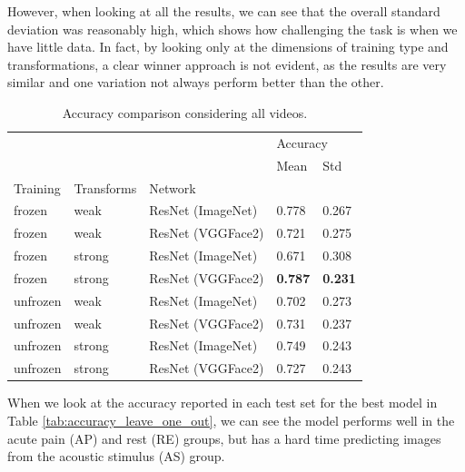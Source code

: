 However, when looking at all the results, we can see that the overall standard deviation was reasonably high, which shows how challenging the task is when we have little data. In fact, by looking only at the dimensions of training type and transformations, a clear winner approach is not evident, as the results are very similar and one variation not always perform better than the other.

\begin{table}[h!tp]
\centering
\caption{Accuracy comparison considering all videos.}
\label{tab:accuracy_all}
\begin{tabular}{lllll}
\toprule
         &        &          & \multicolumn{2}{l}{Accuracy} \\
         &        &          &     Mean &    Std \\
Training & Transforms & Network &          &        \\
\midrule
frozen   & weak   & ResNet (ImageNet) &    0.778 &  0.267 \\
frozen   & weak   & ResNet (VGGFace2) &    0.721 &  0.275 \\
frozen   & strong & ResNet (ImageNet) &    0.671 &  0.308 \\
frozen   & strong & ResNet (VGGFace2) &    \textbf{0.787} & \textbf{ 0.231} \\
unfrozen & weak   & ResNet (ImageNet) &    0.702 &  0.273 \\
unfrozen & weak   & ResNet (VGGFace2) &    0.731 &  0.237 \\
unfrozen & strong & ResNet (ImageNet) &    0.749 &  0.243 \\
unfrozen & strong & ResNet (VGGFace2) &    0.727 &  0.243 \\
\bottomrule
\end{tabular}
\end{table}

When we look at the accuracy reported in each test set for the best model in Table \ref{tab:accuracy_leave_one_out}, we can see the model performs well in the acute pain (AP) and rest (RE) groups, but has a hard time predicting images from the acoustic stimulus (AS) group.

